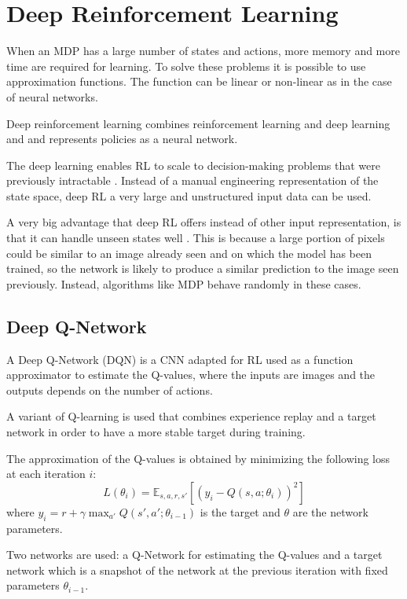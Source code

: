 \section{Deep Reinforcement Learning}
\label{sec:drl}
When an MDP has a large number of states and actions, more memory and more time are required for learning.
To solve these problems it is possible to use approximation functions.
The function can be linear \cite{melo2008analysis} or non-linear as in the case of neural networks.

Deep reinforcement learning \cite{arulkumaran2017deep} combines reinforcement learning and deep learning and and represents policies as a neural network.

The deep learning enables RL to scale to decision-making problems that were previously intractable \cite{arulkumaran2017deep}.
Instead of a manual engineering representation of the state space, deep RL a very large and unstructured input data can be used.

A very big advantage that deep RL offers instead of other input representation,
is that it can handle unseen states well \cite{mnih2013playing} \cite{karpathy2016deep}.
This is because a large portion of pixels could be similar to an image already seen and on which the model has been trained, so the network is likely to produce a similar prediction to the image seen previously. Instead, algorithms like MDP behave randomly in these cases.

\subsection{Deep Q-Network}
A Deep Q-Network (DQN) \cite{mnih2013playing} is a CNN adapted for RL used as a function approximator to estimate the Q-values,
where the inputs are images and the outputs depends on the number of actions.

A variant of Q-learning is used that combines experience replay and a target network in order to have a more stable target during training. 

The approximation of the Q-values is obtained by minimizing the following loss at each iteration $i$:
\begin{equation}
    L(\theta_i) = \mathbb{E}_{s, a, r, s'} [ ( y_i - Q(s, a; \theta_i))^2 ]
\end{equation}
where $y_i = r + \gamma \max_{a'} Q(s', a'; \theta_{i-1})$ is the target and $\theta$ are the network parameters.

Two networks are used: a Q-Network for estimating the Q-values and
a target network which is a snapshot of the network at the previous iteration with fixed parameters $\theta_{i- 1}$.

